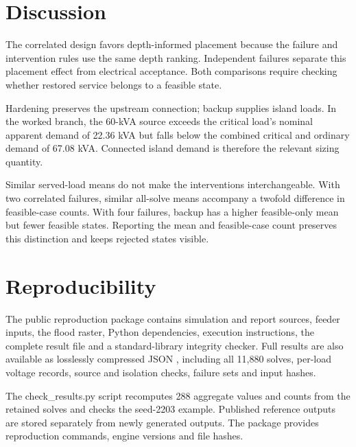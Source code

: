 \documentclass[conference]{IEEEtran}
\begin{document}
\section{Discussion}

The correlated design favors depth-informed placement because the failure and intervention rules use the same depth ranking. Independent failures separate this placement effect from electrical acceptance. Both comparisons require checking whether restored service belongs to a feasible state.

Hardening preserves the upstream connection; backup supplies island loads. In the worked branch, the 60-kVA source exceeds the critical load's nominal apparent demand of 22.36 kVA but falls below the combined critical and ordinary demand of 67.08 kVA. Connected island demand is therefore the relevant sizing quantity.

Similar served-load means do not make the interventions interchangeable. With two correlated failures, similar all-solve means accompany a twofold difference in feasible-case counts. With four failures, backup has a higher feasible-only mean but fewer feasible states. Reporting the mean and feasible-case count preserves this distinction and keeps rejected states visible.

\newpage

\section{Reproducibility}

The public reproduction package \cite{package} contains simulation and report sources, feeder inputs, the flood raster, Python dependencies, execution instructions, the complete result file and a standard-library integrity checker. Full results are also available as losslessly compressed JSON \cite{results}, including all 11,880 solves, per-load voltage records, source and isolation checks, failure sets and input hashes.

The check\_results.py script recomputes 288 aggregate values and counts from the retained solves and checks the seed-2203 example. Published reference outputs are stored separately from newly generated outputs. The package provides reproduction commands, engine versions and file hashes.
\end{document}
